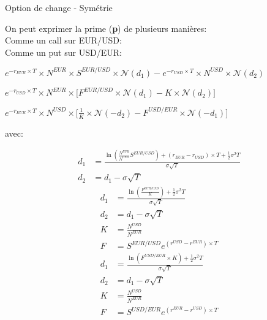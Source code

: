 \documentclass{beamer}
\begin{document}
\begin{frame}{Option de change - Symétrie}
\begin{overprint}
On peut exprimer la prime (\textbf{p}) de plusieurs manières:\\
Comme un call sur EUR/USD:\\
Comme un put sur USD/EUR:\\
\end{overprint}
\vspace{0.5cm}
\begin{overprint}
\begin{center}
$e^{-r_{EUR} \times T} \times N^{EUR} \times S^{EUR/USD} \times \mathcal{N}(d_1)-e^{-r_{USD} \times T} \times N^{USD} \times \mathcal{N}(d_2)$
\end{center}
\begin{center}
$e^{-r_{USD} \times T} \times N^{EUR} \times \big[ F^{EUR/USD} \times \mathcal{N}(d_1)-K \times \mathcal{N}(d_2) \big]$
\end{center}
\begin{center}
$e^{-r_{EUR} \times T} \times N^{USD} \times \big[ \frac{1}{K} \times \mathcal{N}(-d_2)-F^{USD/EUR} \times \mathcal{N}(-d_1) \big]$
\end{center}
\end{overprint}
avec:\\
\begin{overprint}
\begin{align*}
d_1&=\frac{\ln\left( \frac{N^{EUR}}{N^{USD}} S^{EUR/USD} \right)+(r_{EUR}-r_{USD}) \times T+\frac{1}{2}\sigma^2 T}{\sigma\sqrt{T}}\\
d_2&=d_1-\sigma\sqrt{T}
\end{align*}
\begin{align*}
d_1&=\frac{\ln\left( \frac{F^{EUR/USD}}{K} \right) +\frac{1}{2}\sigma^2 T}{\sigma\sqrt{T}}\\
d_2&=d_1-\sigma\sqrt{T}\\
K&=\frac{N^{USD}}{N^{EUR}}\\
F&=S^{EUR/USD}e^{(r^{USD}-r^{EUR}) \times T}
\end{align*}
\begin{align*}
d_1&=\frac{\ln\left( F^{USD/EUR} \times K \right) +\frac{1}{2}\sigma^2 T}{\sigma\sqrt{T}}\\
d_2&=d_1-\sigma\sqrt{T}\\
K&=\frac{N^{USD}}{N^{EUR}}\\
F&=S^{USD/EUR}e^{(r^{EUR}-r^{USD}) \times T}
\end{align*}
\end{overprint}
\end{frame}
\end{document}
